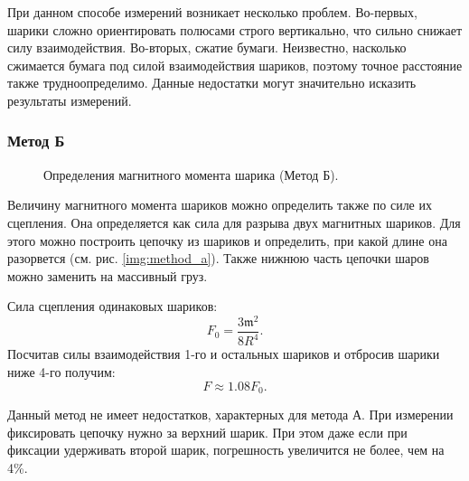 \documentclass[12pt,a4paper]{article}
\newcommand{\figref}[1]{(см. рис. \ref{#1})}
\begin{document}
	При данном способе измерений возникает несколько проблем. Во-первых, шарики сложно ориентировать полюсами строго вертикально, что сильно снижает силу взаимодействия. Во-вторых, сжатие бумаги. Неизвестно, насколько сжимается бумага под силой взаимодействия шариков, поэтому точное расстояние также трудноопределимо. Данные недостатки могут значительно исказить результаты измерений.
	
	\subsubsection*{Метод Б}

	\begin{figure}
		\vspace{-20pt}
		\caption{Определения магнитного момента шарика (Метод Б).}
		\label{img:method_b}
		\vspace{-10pt}
	\end{figure}
	Величину магнитного момен­та шариков можно определить также по си­ле их сцепления. Она определяется как сила для разрыва двух магнитных шариков. Для этого можно построить цепочку из шариков и определить, при какой длине она разорвется \figref{img:method_a}. Также нижнюю часть цепочки шаров можно заменить на массивный груз.
	
	Сила сцепления одинаковых шариков:
	$$ F_0 = \frac{3\mathfrak{m}^2}{8 R^4}. $$
	Посчитав силы взаимодействия 1-го и остальных шариков и отбросив шарики ниже 4-го получим:
	$$ F \approx 1.08 F_0. $$
	
	Данный метод не имеет недостатков, характерных для метода А. При измерении фиксировать цепочку нужно за верхний шарик. При этом даже если при фиксации удерживать второй шарик, погрешность увеличится не более, чем на 4\%.
		
\end{document}
